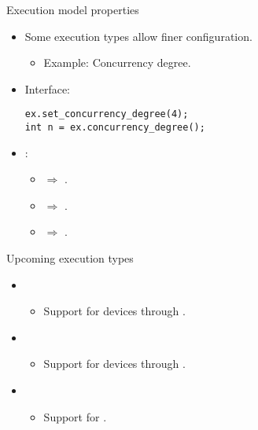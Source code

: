 \begin{frame}[t,fragile]{Execution model properties}
\begin{itemize}
  \item Some execution types allow finer configuration.
    \begin{itemize}
      \item Example: Concurrency degree.
    \end{itemize}

  \vfill\pause
  \item Interface:
\begin{lstlisting}[basicstyle=\small]
ex.set_concurrency_degree(4);
int n = ex.concurrency_degree();
\end{lstlisting}

  \vfill\pause
  \item {}:
    \begin{itemize}
      \item {} $\Rightarrow$ .
      \item {} $\Rightarrow$ .
      \item {} $\Rightarrow$ .
    \end{itemize}

\end{itemize}
\end{frame}

\begin{frame}[t]{Upcoming execution types}
\begin{itemize}
  \item {}
    \begin{itemize}
      \item Support for  devices through .
    \end{itemize}

  \item {}
    \begin{itemize}
      \item Support for  devices through .
    \end{itemize}

  \item {}
    \begin{itemize}
      \item Support for .
    \end{itemize}
\end{itemize}
\end{frame}
